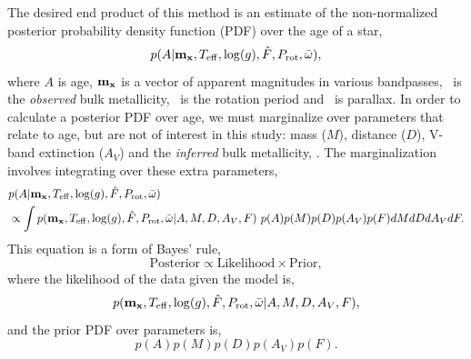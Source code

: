 The desired end product of this method is an estimate of the non-normalized
posterior probability density function (PDF) over the age of a star,
\begin{equation}
    p(A|{\bf m_x}, T_{\mathrm{eff}}, \log(g), \hat{F},
    P_{\mathrm{rot}}, \bar{\omega}),
\end{equation}
where $A$ is age, ${\bf m_x}$ is a vector of
apparent magnitudes in various bandpasses, \fhat\ is the {\it observed} bulk
metallicity, \prot\ is the rotation period and \pmega\ is parallax.
In order to calculate a posterior PDF over age, we must marginalize over
parameters that relate to age, but are not of interest in this study: mass
($M$), distance ($D$), V-band extinction ($A_V$) and the {\it inferred} bulk
metallicity, \feh.
The marginalization involves integrating over these extra parameters,
\begin{eqnarray}
    & p(A|{\bf m_x}, T_{\mathrm{eff}}, \log(g), \hat{F},
    P_{\mathrm{rot}}, \bar{\omega})
\\ \nonumber
    & \propto \int p({\bf m_x}, T_{\mathrm{eff}}, \log(g), \hat{F},
    P_\mathrm{rot}, \bar{\omega}|
    A, M, D, A_V, F)~p(A)p(M)p(D)p(A_V)p(F)dMdDdA_VdF.
\label{eqn:bayes}
\end{eqnarray}
This equation is a form of Bayes' rule,
\begin{equation}
\mathrm{Posterior} \propto \mathrm{Likelihood} \times \mathrm{Prior},
\end{equation}
where the likelihood of the data given the model is,
\begin{equation}
    p({\bf m_x}, T_{\mathrm{eff}}, \log(g), \hat{F}, P_{\mathrm{rot}},
    \bar{\omega}|A, M, D, A_V, F),
\end{equation}
and the prior PDF over parameters is,
\begin{equation}
    p(A)p(M)p(D)p(A_V)p(F).
\label{eqn:prior}
\end{equation}

